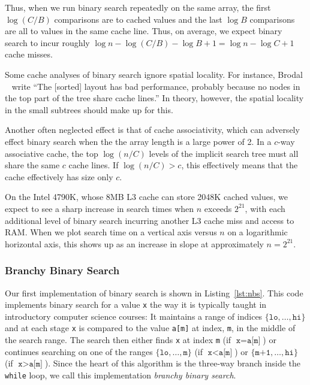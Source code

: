 \documentclass{patmorin}
\newcommand{\lstref}[1]{Listing~\ref{lst:#1}}
\begin{document}
Thus, when we run binary search repeatedly on the same array, the first
$\log(C/B)$ comparisons are to cached values and the last $\log B$
comparisons are all to values in the same cache line.  Thus, on average,
we expect binary search to incur roughly $\log n - \log(C/B) - \log B +
1 = \log n - \log C + 1$ cache misses.

Some cache analyses of binary search ignore spatial locality.
For instance, Brodal \etal\ \cite{brodal.fagerberg.ea:cache} write
``The [sorted] layout has bad performance, probably because no nodes
in the top part of the tree share cache lines.'' In theory, however,
the spatial locality in the small subtrees should make up for this.

Another often neglected effect is that of cache associativity, which
can adversely effect binary search when the the array length is a large
power of 2.  In a $c$-way associative cache, the top $\log (n/C)$ levels
of the implicit search tree must all share the same $c$ cache lines.
If $\log (n/C) > c$, this effectively means that the cache effectively
has size only $c$.  

On the Intel 4790K, whose 8MB L3 cache can store 2048K cached values, we
expect to see a sharp increase in search times when $n$ exceeds $2^{21}$,
with each additional level of binary search incurring another L3 cache
miss and access to RAM.  When we plot search time on a vertical axis
versus $n$ on a logarithmic horizontal axis, this shows up as an increase
in slope at approximately $n=2^{21}$.

\subsubsection{Branchy Binary Search}

Our first implementation of binary search is shown in
\lstref{nbs}. This code implements binary search for a
value \texttt{x} the way it is typically taught in
introductory computer science courses: It maintains a range of indices
$\{\texttt{lo},\ldots,\texttt{hi}\}$ and at each stage
\texttt{x} is compared to the value \texttt{a[m]} at
index, \texttt{m}, in the middle of the search range. The search
then either finds \texttt{x} at index \texttt{m} (if
$\texttt{x}=\texttt{a[m]}$) or continues searching on
one of the ranges $\{\texttt{lo},\ldots,\texttt{m}\}$
(if $\texttt{x}<\texttt{a[m]}$) or
$\{\texttt{m+1},\ldots,\texttt{hi}\}$ (if
$\texttt{x}>\texttt{a[m]}$).  Since the heart of this
algorithm is the three-way branch inside the \texttt{while}
loop, we call this implementation \emph{branchy binary search}.
\end{document}
